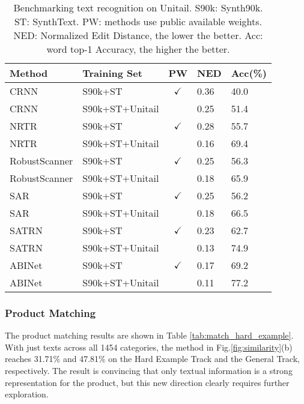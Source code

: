 \documentclass[runningheads]{llncs}
\begin{document}
\begin{SCtable}[]
\centering
\setlength\tabcolsep{1.2pt}
\caption{Benchmarking text recognition on Unitail. S90k: Synth90k. ST: SynthText. PW: methods use public available weights. NED: Normalized Edit Distance, the lower the better. Acc: word top-1 Accuracy, the higher the better.}
\begin{tabular}{l|l|c|ll}
\hline \hline
Method      & Training Set     &  PW            & NED     & Acc(\%)   \\ \hline
CRNN\cite{CRNN}        & S90k+ST            & $\checkmark$   & 0.36    & 40.0     \\
CRNN        & S90k+ST+Unitail    &                & 0.25    & 51.4    \\
NRTR\cite{sheng2019nrtr}        & S90k+ST            & $\checkmark$   & 0.28    & 55.7     \\
NRTR        & S90k+ST+Unitail    &                & 0.16    & 69.4    \\
RobustScanner\cite{yue2020robustscanner}        & S90k+ST            & $\checkmark$   & 0.25    & 56.3     \\
RobustScanner        & S90k+ST+Unitail    &                & 0.18    & 65.9    \\
SAR\cite{li2019SAR}        & S90k+ST            & $\checkmark$   & 0.25    & 56.2     \\
SAR        & S90k+ST+Unitail    &                & 0.18    & 66.5    \\
SATRN\cite{SATRN}        & S90k+ST            & $\checkmark$   & 0.23    & 62.7     \\
SATRN        & S90k+ST+Unitail    &                & 0.13    & 74.9    \\
ABINet\cite{fang2021ABINet}        & S90k+ST            & $\checkmark$   & 0.17    & 69.2     \\
ABINet        & S90k+ST+Unitail    &                & 0.11    & 77.2    \\
\hline
\end{tabular}
\label{tab:textrecog}
\end{SCtable}

\subsubsection{Product Matching}
The product matching results are shown in Table \ref{tab:match_hard_example}. With just texts across all 1454 categories, the method in Fig.\ref{fig:similarity}(b) reaches 31.71\% and 47.81\% on the Hard Example Track and the General Track, respectively. The result is convincing that only textual information is a strong representation for the product, but this new direction clearly requires further exploration.
\end{document}
